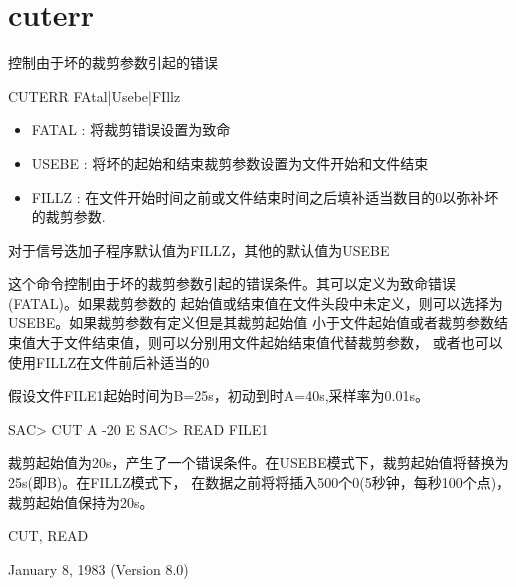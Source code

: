 \section{cuterr}
\label{cmd:cuterr}

控制由于坏的裁剪参数引起的错误

CUTERR FAtal|Usebe|FIllz

\begin{itemize}
\item FATAL : 将裁剪错误设置为致命
\item USEBE : 将坏的起始和结束裁剪参数设置为文件开始和文件结束 
\item FILLZ : 在文件开始时间之前或文件结束时间之后填补适当数目的0以弥补坏的裁剪参数.
\end{itemize}

对于信号迭加子程序默认值为FILLZ，其他的默认值为USEBE

这个命令控制由于坏的裁剪参数引起的错误条件。其可以定义为致命错误(FATAL)。如果裁剪参数的
起始值或结束值在文件头段中未定义，则可以选择为USEBE。如果裁剪参数有定义但是其裁剪起始值
小于文件起始值或者裁剪参数结束值大于文件结束值，则可以分别用文件起始结束值代替裁剪参数，
或者也可以使用FILLZ在文件前后补适当的0

假设文件FILE1起始时间为B=25s，初动到时A=40s,采样率为0.01s。
\begin{SACCode}
SAC> CUT A -20 E
SAC> READ FILE1
\end{SACCode}
裁剪起始值为20s，产生了一个错误条件。在USEBE模式下，裁剪起始值将替换为25s(即B)。在FILLZ模式下，
在数据之前将将插入500个0(5秒钟，每秒100个点)，裁剪起始值保持为20s。

CUT, READ

January 8, 1983 (Version 8.0)
